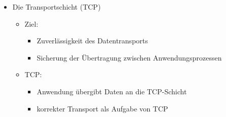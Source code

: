 \documentclass{scrreprt}
\begin{document}
\begin{itemize}
\begin{itemize}
\begin{figure}[h]
			\centering
		\end{figure}
	\end{itemize}
	\item Die Transportschicht (TCP)
	\begin{itemize}
		\item Ziel:
		\begin{itemize}
			\item Zuverlässigkeit des Datentransports
			\item Sicherung der Übertragung zwischen Anwendungsprozessen
		\end{itemize}
		\item TCP:
		\begin{itemize}
			\item Anwendung übergibt Daten an die TCP-Schicht
			\item korrekter Transport als Aufgabe von TCP
		\end{itemize}
	\end{itemize}
\end{itemize}
\end{document}
